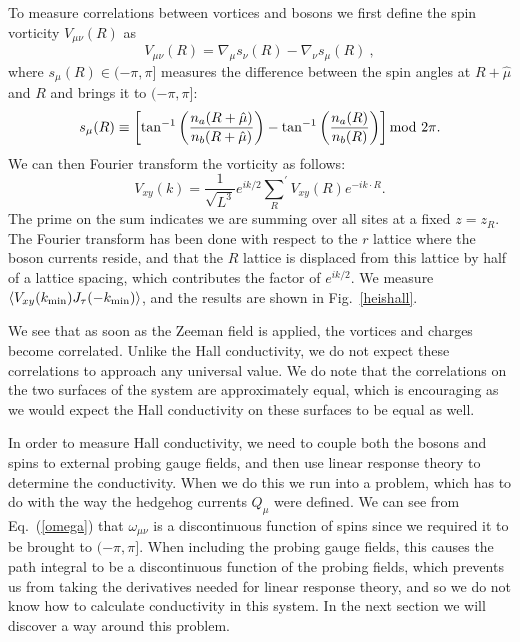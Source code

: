 \documentclass[prb,twocolumn]{revtex4-1}
\def\ra{\rangle} %
\def\la{\langle} %
\begin{document}
To measure correlations between vortices and bosons we first define the spin vorticity $V_{\mu\nu}(R)$ as
\begin{equation}
V_{\mu\nu}(R) = \nabla_\mu s_{\nu}(R) - \nabla_\nu s_{\mu}(R) ~,
\end{equation}
where $s_\mu(R) \in (-\pi, \pi]$ measures the difference between the spin angles at $R+\hat{\mu}$ and $R$ and brings it to $(-\pi,\pi]$:
\begin{equation}
s_{\mu}(R)\equiv \left[\tan^{-1}\left(\frac{n_a(R+\hat{\mu})}{n_b(R+\hat{\mu})}\right) -\tan^{-1}\left(\frac{n_a(R)}{n_b(R)}\right)\right]{\rm mod}~2\pi.\nonumber
\end{equation}
We can then Fourier transform the vorticity as follows:
\begin{equation}
V_{xy}(k) = \frac{1}{\sqrt{L^3}}e^{ik/2}{\sum_{R}}^\prime V_{xy}(R) e^{-ik\cdot R}.
\end{equation}
The prime on the sum indicates we are summing over all sites at a fixed $z=z_R$. The Fourier transform has been done with respect to the $r$ lattice where the boson currents reside, and that the $R$ lattice is displaced from this lattice by half of a lattice spacing, which contributes the factor of $e^{ik/2}$. We measure $\la V_{xy}(k_{\rm min})J_\tau(-k_{\rm min})\ra$, and the results are shown in Fig.~\ref{heishall}. 

We see that as soon as the Zeeman field is applied, the vortices and charges become correlated. Unlike the Hall conductivity, we do not expect these correlations to approach any universal value. We do note that the correlations on the two surfaces of the system are approximately equal, which is encouraging as we would expect the Hall conductivity on these surfaces to be equal as well.

In order to measure Hall conductivity, we need to couple both the bosons and spins to external probing gauge fields, and then use linear response theory to determine the conductivity. When we do this we run into a problem, which has to do with the way the hedgehog currents $Q_\mu$ were defined. We can see from Eq.~(\ref{omega}) that $\omega_{\mu\nu}$ is a discontinuous function of spins since we required it to be brought to $(-\pi, \pi]$. When including the probing gauge fields, this causes the path integral to be a discontinuous function of the probing fields, which prevents us from taking the derivatives needed for linear response theory, and so we do not know how to calculate conductivity in this system. In the next section we will discover a way around this problem.
\end{document}

